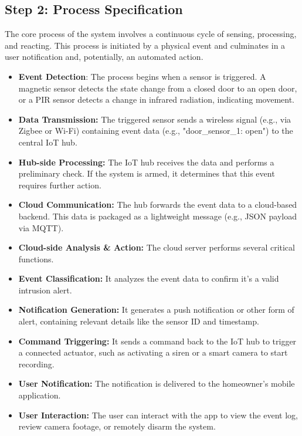 \documentclass[conference]{IEEEtran}
\begin{document}
\subsection{Step 2: Process Specification}
The core process of the system involves a continuous cycle of sensing, processing, and reacting. This process is initiated by a physical event and culminates in a user notification and, potentially, an automated action\cite{startertutorials_IoT_methodology, cisco_packettracer_iot}.
\begin{itemize}
    \item \textbf{Event Detection}: The process begins when a sensor is triggered. A magnetic sensor detects the state change from a closed door to an open door, or a PIR sensor detects a change in infrared radiation, indicating movement.
    \item \textbf{Data Transmission:} The triggered sensor sends a wireless signal (e.g., via Zigbee or Wi-Fi) containing event data (e.g., "door\_sensor\_1: open") to the central IoT hub.
    \item \textbf{Hub-side Processing:} The IoT hub receives the data and performs a preliminary check. If the system is armed, it determines that this event requires further action.
    \item \textbf{Cloud Communication:} The hub forwards the event data to a cloud-based backend. This data is packaged as a lightweight message (e.g., JSON payload via MQTT).
    \item \textbf{Cloud-side Analysis \& Action:} The cloud server performs several critical functions.
    \item \textbf{Event Classification:} It analyzes the event data to confirm it's a valid intrusion alert.
    \item \textbf{Notification Generation:} It generates a push notification or other form of alert, containing relevant details like the sensor ID and timestamp.
    \item \textbf{Command Triggering:} It sends a command back to the IoT hub to trigger a connected actuator, such as activating a siren or a smart camera to start recording.
    \item \textbf{User Notification:} The notification is delivered to the homeowner's mobile application.
    \item \textbf{User Interaction:} The user can interact with the app to view the event log, review camera footage, or remotely disarm the system.
\end{itemize}
\end{document}
